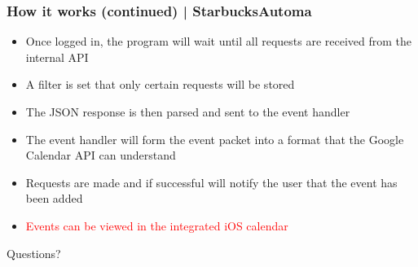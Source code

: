 \documentclass{beamer}
\begin{document}
\begin{frame}
\frametitle{How it works (continued) | StarbucksAutoma}
\begin{itemize}
		\item Once logged in, the program will wait until all requests are received from the internal API
		\item A filter is set that only certain requests will be stored
		\item The JSON response is then parsed and sent to the event handler
		\item The event handler will form the event packet into a format that the Google Calendar API can understand
		\item Requests are made and if successful will notify the user that the event has been added
		\item \textcolor{red}{Events can be viewed in the integrated iOS calendar}
\end{itemize}
\end{frame}

\begin{frame}

\begin{center}
Questions?
\end{center}

\end{frame}
\end{document}
